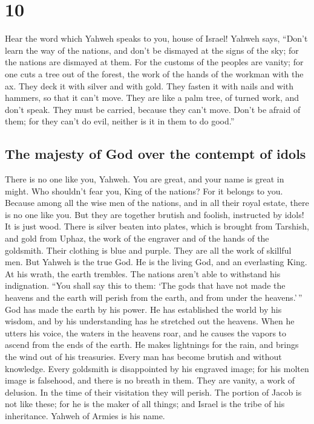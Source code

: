 \hypertarget{section-9}{%
\section{10}\label{section-9}}

 Hear the word which Yahweh speaks to you, house of
Israel!  Yahweh says, ``Don't learn the way of the
nations, and don't be dismayed at the signs of the sky; for the nations
are dismayed at them.  For the customs of the peoples are
vanity; for one cuts a tree out of the forest, the work of the hands of
the workman with the ax.  They deck it with silver and
with gold. They fasten it with nails and with hammers, so that it can't
move.  They are like a palm tree, of turned work, and
don't speak. They must be carried, because they can't move. Don't be
afraid of them; for they can't do evil, neither is it in them to do
good.''

\hypertarget{the-majesty-of-god-over-the-contempt-of-idols}{%
\subsection{The majesty of God over the contempt of
idols}\label{the-majesty-of-god-over-the-contempt-of-idols}}

 There is no one like you, Yahweh. You are great, and your
name is great in might.  Who shouldn't fear you, King of
the nations? For it belongs to you. Because among all the wise men of
the nations, and in all their royal estate, there is no one like you.
 But they are together brutish and foolish, instructed by
idols! It is just wood.  There is silver beaten into
plates, which is brought from Tarshish, and gold from Uphaz, the work of
the engraver and of the hands of the goldsmith. Their clothing is blue
and purple. They are all the work of skillful men.  But
Yahweh is the true God. He is the living God, and an everlasting King.
At his wrath, the earth trembles. The nations aren't able to withstand
his indignation.  ``You shall say this to them: `The gods
that have not made the heavens and the earth will perish from the earth,
and from under the heavens.'\,''  God has made the earth
by his power. He has established the world by his wisdom, and by his
understanding has he stretched out the heavens.  When he
utters his voice, the waters in the heavens roar, and he causes the
vapors to ascend from the ends of the earth. He makes lightnings for the
rain, and brings the wind out of his treasuries.  Every
man has become brutish and without knowledge. Every goldsmith is
disappointed by his engraved image; for his molten image is falsehood,
and there is no breath in them.  They are vanity, a work
of delusion. In the time of their visitation they will perish.
 The portion of Jacob is not like these; for he is the
maker of all things; and Israel is the tribe of his inheritance. Yahweh
of Armies is his name.

